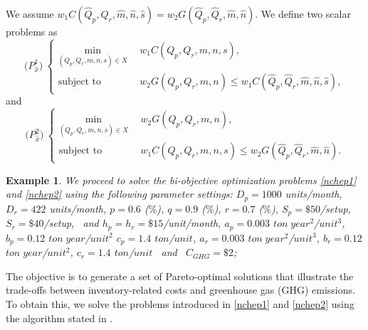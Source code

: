 \documentclass[11pt]{article}
\newtheorem{example}{Example}[section]
\newcommand{\ds}{\displaystyle}
\begin{document}
\noindent We assume $w_1C(\hat{Q}_p,\hat{Q}_r,\hat{m},\hat{n},\hat{s})=w_2G(\hat{Q}_p,\hat{Q}_r,\hat{m},\hat{n})$. We define two scalar problems as
\begin{equation} \label{nchep1}
\mbox{($P_{\hat{x}}^1$)}\ \left\{\begin{array}{rl} \ds\min_{(Q_p,Q_r,m,n,s) \in  X} & \
\ w_1C(Q_p,Q_r,m,n,s),
\\[4mm]
\mbox{subject to} & \ \ w_2G(Q_p, Q_r, m , n) \leq w_1C(\hat{Q}_p,\hat{Q}_r,\hat{m},\hat{n},\hat{s}),
\end{array}
\right.
\end{equation}
and
\begin{equation} \label{nchep2}
\mbox{($P_{\hat{x}}^2$)}\ \left\{\begin{array}{rl} \ds\min_{(Q_p,Q_r,m,n,s)\in  X} & \
\ w_{2}G(Q_p, Q_r, m , n),
\\[4mm]
\mbox{subject to} & \ \ w_1C(Q_p,Q_r,m,n,s) \leq w_2G(\hat{Q}_p, \hat{Q}_r, \hat{m} , \hat{n}).
\end{array}
\right.
\end{equation}

\noindent
\begin{example}\label{multexam}
	We proceed to solve the bi-objective optimization problems \eqref{nchep1} and \eqref{nchep2} using the following parameter settings:  \(D_p=1000\) units/month, \(D_r=422\) units/month, \(p=0.6\) ($\%$), \(q=0.9\) ($\%$), \(r=0.7\) ($\%$), \(S_p=\$50\)/setup, \(S_r=\$40\)/setup,  \ and \(h_p=h_r=\$15\)/unit/month, $a_p=0.003$ $ton \;year^2$/$unit^3$, $b_p=0.12$ $ton \;year$/$unit^2$ $c_p=1.4$ $ton$/$unit$, $a_r=0.003$ $ton \;year^2$/$unit^3$, $b_r=0.12$ $ton \;year$/$unit^2$, $c_r=1.4$ $ton$/$unit$ \ and \ $C_{GHG}=\$ 2$;
\end{example}
\noindent The objective is to generate a set of Pareto-optimal solutions that illustrate the trade-offs between inventory-related costs and greenhouse gas (GHG) emissions. To obtain this, we solve the problems introduced in \eqref{nchep1} and \eqref{nchep2} using the algorithm stated in  \cite[Appendix A.2., Algorithm 1]{Indu2025}.
\end{document}
